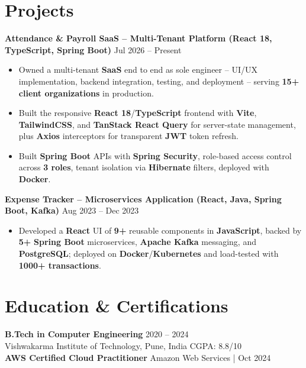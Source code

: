 \documentclass[a4paper,10pt]{article}
\begin{document}
\section*{Projects}

\textbf{Attendance \& Payroll SaaS -- Multi-Tenant Platform (React 18, TypeScript, Spring Boot)} \hfill Jul 2026 -- Present
\begin{itemize}[leftmargin=*]
    \item Owned a multi-tenant \textbf{SaaS} end to end as sole engineer -- UI/UX implementation, backend integration, testing, and deployment -- serving \textbf{15+ client organizations} in production.
    \item Built the responsive \textbf{React 18}/\textbf{TypeScript} frontend with \textbf{Vite}, \textbf{TailwindCSS}, and \textbf{TanStack React Query} for server-state management, plus \textbf{Axios} interceptors for transparent \textbf{JWT} token refresh.
    \item Built \textbf{Spring Boot} APIs with \textbf{Spring Security}, role-based access control across \textbf{3 roles}, tenant isolation via \textbf{Hibernate} filters, deployed with \textbf{Docker}.
\end{itemize}

\textbf{Expense Tracker -- Microservices Application (React, Java, Spring Boot, Kafka)} \hfill Aug 2023 -- Dec 2023
\begin{itemize}[leftmargin=*]
    \item Developed a \textbf{React} UI of \textbf{9+} reusable components in \textbf{JavaScript}, backed by \textbf{5+} \textbf{Spring Boot} microservices, \textbf{Apache Kafka} messaging, and \textbf{PostgreSQL}; deployed on \textbf{Docker}/\textbf{Kubernetes} and load-tested with \textbf{1000+ transactions}.
\end{itemize}

\section*{Education \& Certifications}
\textbf{B.Tech in Computer Engineering} \hfill 2020 -- 2024 \\
Vishwakarma Institute of Technology, Pune, India \hfill CGPA: 8.8/10 \\
\textbf{AWS Certified Cloud Practitioner} \hfill Amazon Web Services \;|\; Oct 2024
\end{document}
